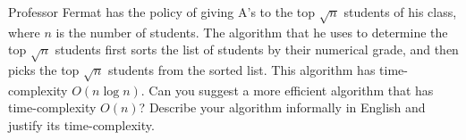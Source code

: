Professor Fermat has the policy of giving A's to the top $\sqrt{n}$
students of his class, where $n$ is the number of students.  The
algorithm that he uses to determine the top $\sqrt{n}$ students first
sorts the list of students by their numerical grade, and then picks the
top $\sqrt{n}$ students from the sorted list. This algorithm has
time-complexity $O(n\log  n)$.  Can you suggest a more efficient
algorithm that has time-complexity $O(n)$?  Describe your algorithm
informally in English and justify its time-complexity.
